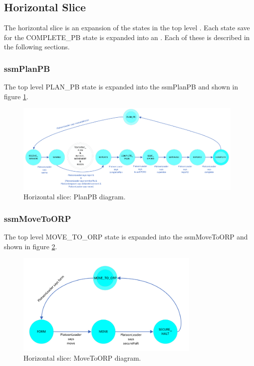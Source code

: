 \documentclass[../../main/main.tex]{subfiles}
\begin{document}
\subsection{Horizontal Slice}\label{ssec:horizontalslice}
The horizontal slice is an expansion of the states in the top level .  Each state save for the COMPLETE_PB state is expanded into an .  Each of these  is described in the following sections.
\subsubsection{ssmPlanPB}\label{sssec:ssmPlanPB}
The top level PLAN_PB state is expanded into the ssmPlanPB  and shown in figure \ref{ssmPlanPBDiagram}.

\begin{figure}[h!]
\centering
\includegraphics[width=\textwidth]{../figures/ssmPlanPBDiagram}
\caption{\label{ssmPlanPBDiagram} Horizontal slice: PlanPB diagram.}
\end{figure}
\clearpage

\subsubsection{ssmMoveToORP}\label{sssec:ssmMoveToORP}
The top level MOVE_TO_ORP state is expanded into the ssmMoveToORP  and shown in figure \ref{ssmMoveToORPDiagram}.

\begin{figure}[!h]
\centering
\includegraphics[width=0.8\textwidth]{../figures/ssmMoveToORPDiagram}
\caption{\label{ssmMoveToORPDiagram} Horizontal slice: MoveToORP diagram.}
\end{figure}
\clearpage
\end{document}

